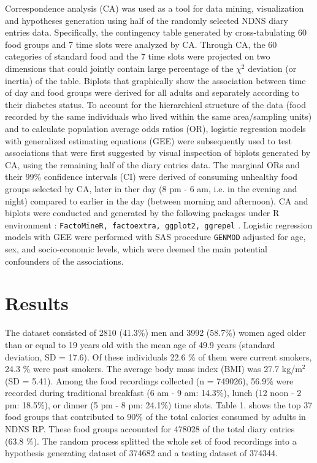\documentclass{bmcart}
\begin{document}
Correspondence analysis (CA) \cite{greenacre2017correspondence,Chapman2017,palla2020adolescents} was used as a tool for data mining, visualization and hypotheses generation using half of the randomly selected NDNS diary entries data. Specifically, the contingency table generated by cross-tabulating 60 food groups and 7 time slots were analyzed by CA. Through CA, the 60 categories of standard food and the 7 time slots were projected on two dimensions that could jointly contain large percentage of the $\chi^2$ deviation (or inertia) of the table. Biplots that graphically show the association between time of day and food groups were derived for all adults and separately according to their diabetes status. To account for the hierarchical structure of the data (food recorded by the same individuals who lived within the same area/sampling units) and to calculate population average odds ratios (OR), logistic regression models with generalized estimating equations (GEE) were subsequently used to test associations that were first suggested by visual inspection of biplots generated by CA, using the remaining half of the diary entries data. The marginal ORs and their 99\% confidence intervals (CI) were derived of consuming unhealthy food groups selected by CA, later in ther day (8 pm - 6 am, i.e. in the evening and night) compared to earlier in the day (between morning and afternoon). CA and biplots were conducted and generated by the following packages under R environment \cite{Rcoreteam}: \texttt{FactoMineR, factoextra, ggplot2, ggrepel} \cite{L__2008,factoextra,ggplot2,ggrepel}. Logistic regression models with GEE were performed with SAS procedure \texttt{GENMOD} \cite{SAS94} adjusted for age, sex, and socio-economic levels, which were deemed the main potential confounders of the associations. 


\section*{Results}
The dataset consisted of 2810 (41.3\%) men and 3992 (58.7\%) women aged older than or equal to 19 years old with the mean age of 49.9 years (standard deviation, SD = 17.6). Of these individuals 22.6 \% of them were current smokers, 24.3 \% were past smokers. The average body mass index (BMI) was 27.7 kg/m$^2$ (SD = 5.41). Among the food recordings collected (n = 749026), 56.9\% were recorded during traditional breakfast (6 am - 9 am: 14.3\%), lunch (12 noon - 2 pm: 18.5\%), or dinner (5 pm - 8 pm: 24.1\%) time slots. Table 1. shows the top 37 food groups that contributed to 90\% of the total calories consumed by adults in NDNS RP. These food groups accounted for 478028 of the total diary entries (63.8 \%). The random process splitted the whole set of food recordings into a hypothesis generating dataset of 374682 and a testing dataset of 374344. 
\end{document}
